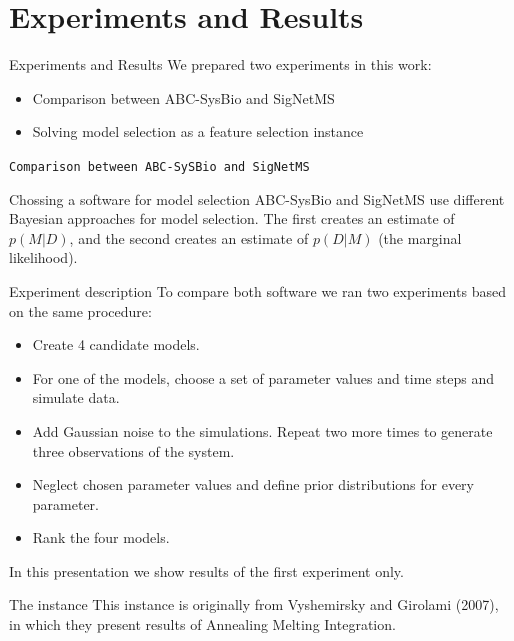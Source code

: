 \documentclass{beamer}
\begin{document}
\section{Experiments and Results}
\begin{frame}{Experiments and Results}
We prepared two experiments in this work: \pause
    \begin{itemize}
        \item{Comparison between ABC-SysBio and SigNetMS}
        \item{Solving model selection as a feature selection instance}
    \end{itemize}
\end{frame}

\begin{frame}{}
\begin{center}
    \texttt{Comparison between ABC-SySBio and SigNetMS}
\end{center}
\end{frame}

\begin{frame}{Chossing a software for model selection}
ABC-SysBio and SigNetMS use different Bayesian approaches for model
selection. \pause The first creates an estimate of $p(M|D)$, \pause and
the second creates an estimate of $p(D|M)$ (the marginal likelihood).
\end{frame}

\begin{frame}{Experiment description}
To compare both software we ran two experiments based on the same 
procedure:
\begin{itemize}
    \pause
    \item{Create 4 candidate models.}
    \pause
    \item{For one of the models, choose a set of parameter values 
        and time steps and simulate data.}
    \pause
    \item{Add Gaussian noise to the simulations. Repeat two more 
        times to generate three observations of the system.}
    \pause
    \item{Neglect chosen parameter values and define prior distributions
        for every parameter.}
    \pause
    \item{Rank the four models.}
\end{itemize}
\pause In this presentation we show results of the first experiment
only.
\end{frame}

\begin{frame}{The instance}
This instance is originally from Vyshemirsky and Girolami (2007), in 
which they present results of Annealing Melting Integration. 
\end{frame}
\end{document}
